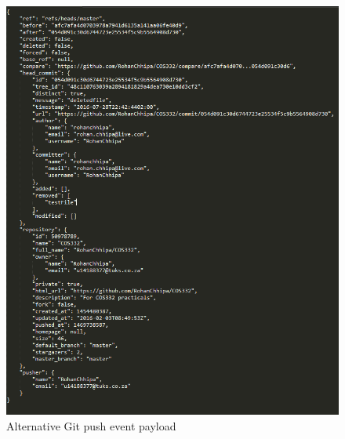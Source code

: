 \documentclass[11pt,a4paper]{article}
\begin{document}
\begin{figure}[H]
	\centering
	\includegraphics[width=\linewidth]{../Images/altgitpush}
	\caption{Alternative Git push event payload}
\end{figure}
\end{document}
